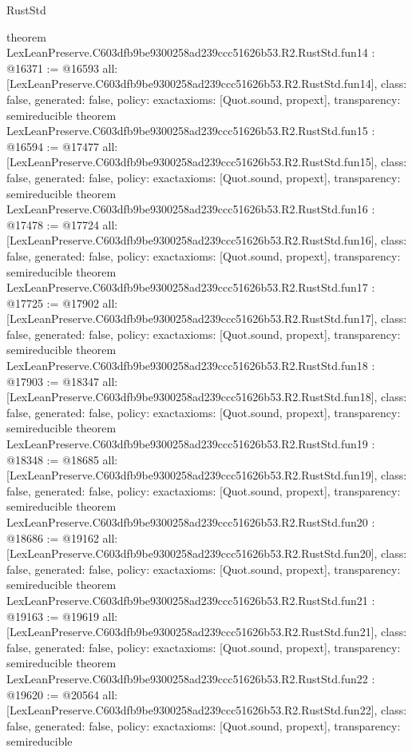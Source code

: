 \begin{lexlean}{RustStd}
\begin{coremodule}
{}
theorem LexLeanPreserve.C603dfb9be9300258ad239ccc51626b53.R2.RustStd.fun14 : @16371 := @16593 {
  all: [LexLeanPreserve.C603dfb9be9300258ad239ccc51626b53.R2.RustStd.fun14],
  class: false,
  generated: false,
  policy: exact{axioms: [Quot.sound, propext]},
  transparency: semireducible
}
theorem LexLeanPreserve.C603dfb9be9300258ad239ccc51626b53.R2.RustStd.fun15 : @16594 := @17477 {
  all: [LexLeanPreserve.C603dfb9be9300258ad239ccc51626b53.R2.RustStd.fun15],
  class: false,
  generated: false,
  policy: exact{axioms: [Quot.sound, propext]},
  transparency: semireducible
}
theorem LexLeanPreserve.C603dfb9be9300258ad239ccc51626b53.R2.RustStd.fun16 : @17478 := @17724 {
  all: [LexLeanPreserve.C603dfb9be9300258ad239ccc51626b53.R2.RustStd.fun16],
  class: false,
  generated: false,
  policy: exact{axioms: [Quot.sound, propext]},
  transparency: semireducible
}
theorem LexLeanPreserve.C603dfb9be9300258ad239ccc51626b53.R2.RustStd.fun17 : @17725 := @17902 {
  all: [LexLeanPreserve.C603dfb9be9300258ad239ccc51626b53.R2.RustStd.fun17],
  class: false,
  generated: false,
  policy: exact{axioms: [Quot.sound, propext]},
  transparency: semireducible
}
theorem LexLeanPreserve.C603dfb9be9300258ad239ccc51626b53.R2.RustStd.fun18 : @17903 := @18347 {
  all: [LexLeanPreserve.C603dfb9be9300258ad239ccc51626b53.R2.RustStd.fun18],
  class: false,
  generated: false,
  policy: exact{axioms: [Quot.sound, propext]},
  transparency: semireducible
}
theorem LexLeanPreserve.C603dfb9be9300258ad239ccc51626b53.R2.RustStd.fun19 : @18348 := @18685 {
  all: [LexLeanPreserve.C603dfb9be9300258ad239ccc51626b53.R2.RustStd.fun19],
  class: false,
  generated: false,
  policy: exact{axioms: [Quot.sound, propext]},
  transparency: semireducible
}
theorem LexLeanPreserve.C603dfb9be9300258ad239ccc51626b53.R2.RustStd.fun20 : @18686 := @19162 {
  all: [LexLeanPreserve.C603dfb9be9300258ad239ccc51626b53.R2.RustStd.fun20],
  class: false,
  generated: false,
  policy: exact{axioms: [Quot.sound, propext]},
  transparency: semireducible
}
theorem LexLeanPreserve.C603dfb9be9300258ad239ccc51626b53.R2.RustStd.fun21 : @19163 := @19619 {
  all: [LexLeanPreserve.C603dfb9be9300258ad239ccc51626b53.R2.RustStd.fun21],
  class: false,
  generated: false,
  policy: exact{axioms: [Quot.sound, propext]},
  transparency: semireducible
}
theorem LexLeanPreserve.C603dfb9be9300258ad239ccc51626b53.R2.RustStd.fun22 : @19620 := @20564 {
  all: [LexLeanPreserve.C603dfb9be9300258ad239ccc51626b53.R2.RustStd.fun22],
  class: false,
  generated: false,
  policy: exact{axioms: [Quot.sound, propext]},
  transparency: semireducible
}
\end{coremodule}
\end{lexlean}
